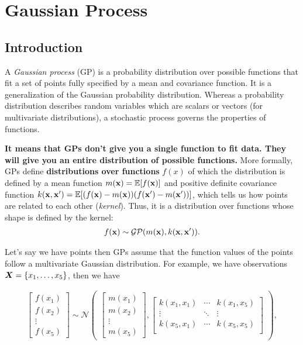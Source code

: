 \chapter{Gaussian Process}

\section{Introduction}
\label{sec:gaussian_process}
A \textit{Gaussian process} (GP) is a probability distribution over possible functions that fit a set of points fully specified by a mean and covariance function. It is a generalization of the Gaussian probability distribution. Whereas a probability distribution describes random variables which are scalars or vectors (for multivariate distributions), a stochastic process governs the properties of functions.


\textbf{It means that GPs don't give you a single function to fit data. They will give you an entire distribution of possible functions.} More formally, GPs define \textbf{distributions over functions} $f(x)$ of which the distribution is defined by a mean function $m({\mathbf{x}})=\mathbb{E}[f({\mathbf{x}})]$ and positive definite covariance function $k({\mathbf{x}},{\mathbf{x}}')=\mathbb{E}[(f({\mathbf{x}})-m({\mathbf{x}}))(f({\mathbf{x}}')-m({\mathbf{x}}'))]$, which tells us how points are related to each other (\ie \textit{kernel}). Thus, it is a distribution over functions whose shape is defined by the kernel:
\begin{align*}
	f({\mathbf{x}}) \sim \mathcal{GP}(m({\mathbf{x}}),k({\mathbf{x}},{\mathbf{x}}')).
\end{align*}

Let's say we have points then GPs assume that the function values of the points follow a multivariate Gaussian distribution. For example, we have observations ${\bm{X}}=\{x_1, \dots, x_5\}$, then we have

\begin{align*}
	\begin{bmatrix}
		f(x_1)\\
		f(x_2)\\
		\vdots \\
		f(x_5)
	\end{bmatrix}\sim \mathcal{N}
	\begin{pmatrix}
	\begin{bmatrix}
		m(x_1)\\
		m(x_2)\\
		\vdots\\
		m(x_5)
	\end{bmatrix},
	\begin{bmatrix}
		k(x_1,x_1)& \cdots& k(x_1,x_5)\\
		\vdots& \ddots& \vdots\\
		k(x_5,x_1)& \cdots& k(x_5,x_5)\\
	\end{bmatrix}
	\end{pmatrix},
\end{align*}


